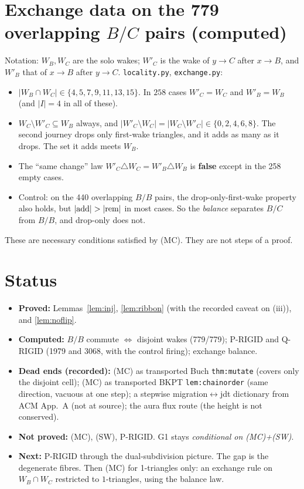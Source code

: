 \documentclass[11pt]{article}
\theoremstyle{definition}
\begin{document}
\section{Exchange data on the 779 overlapping $B/C$ pairs (computed)}
Notation: $W_B,W_C$ are the solo wakes; $W'_C$ is the wake of $y\to C$ after $x\to B$, and $W'_B$ that of $x\to B$ after $y\to C$. \texttt{locality.py}, \texttt{exchange.py}:
\begin{itemize}
\item $|W_B\cap W_C|\in\{4,5,7,9,11,13,15\}$. In $258$ cases $W'_C=W_C$ and $W'_B=W_B$ (and $|I|=4$ in all of these).
\item $W_C\setminus W'_C\subseteq W_B$ always, and $|W'_C\setminus W_C|=|W_C\setminus W'_C|\in\{0,2,4,6,8\}$. The second journey drops only first-wake
triangles, and it adds as many as it drops. The set it adds meets $W_B$.
\item The ``same change'' law $W'_C\triangle W_C=W'_B\triangle W_B$ is \textbf{false} except in the 258 empty cases.
\item Control: on the 440 overlapping $B/B$ pairs, the drop-only-first-wake property also holds, but $|{\rm add}|>|{\rm rem}|$ in most cases.
So the \emph{balance} separates $B/C$ from $B/B$, and drop-only does not.
\end{itemize}
These are necessary conditions satisfied by (MC). They are not steps of a proof.

\section{Status}
\begin{itemize}
\item \textbf{Proved:} Lemmas~\ref{lem:inj}, \ref{lem:ribbon} (with the recorded caveat on (iii)), and \ref{lem:noflip}.
\item \textbf{Computed:} $B/B$ commute $\Leftrightarrow$ disjoint wakes (779/779); P-RIGID and Q-RIGID (1979 and 3068, with the control firing); exchange balance.
\item \textbf{Dead ends (recorded):} (MC) as transported Buch \texttt{thm:mutate} (covers only the disjoint cell); (MC) as transported BKPT
\texttt{lem:chainorder} (same direction, vacuous at one step); a stepwise migration$\leftrightarrow$jdt dictionary from ACM App.~A (not at source); the aura flux route (the height is not conserved).
\item \textbf{Not proved:} (MC), (SW), P-RIGID. G1 stays \emph{conditional on (MC)+(SW)}.
\item \textbf{Next:} P-RIGID through the dual-subdivision picture. The gap is the degenerate fibres. Then (MC) for 1-triangles only: an exchange rule on
$W_B\cap W_C$ restricted to $1$-triangles, using the balance law.
\end{itemize}
\end{document}
